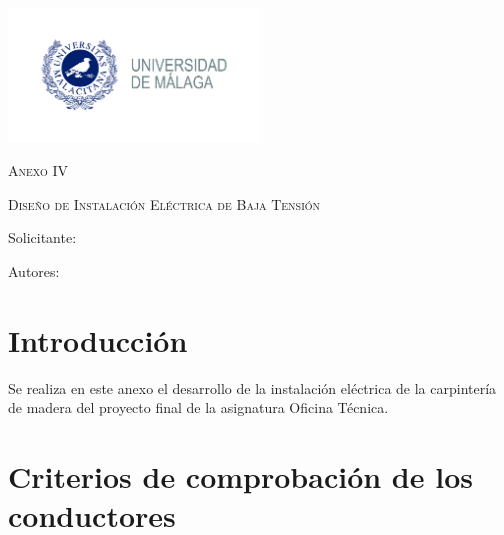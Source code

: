 \documentclass[../main.tex]{subfiles}
\begin{document}
\newpage
\thispagestyle{empty}
\begin{center}
    {\includegraphics[width=0.5\textwidth]{Imagenes/Logo UMA.jpg}\par}
    \vspace{1cm}
    {\bfseries\LARGE \Facultad \par}
    \vspace{0.5cm}
    {\scshape\Large \Grado \par}
    \vspace{1cm}
    {\scshape\Huge Anexo IV \par}
    \vspace{0.5cm}
    {\scshape\Huge Diseño de Instalación Eléctrica de Baja Tensión \par}
    \vspace{1.5cm}
    {\itshape\Large \TituloProyecto \par}
    \vfill
    {\Large Solicitante: \par}
    {\Large \Solicitante  \par}
    \vspace{1cm}
    {\Large Autores: \par}
    {\Large \Autora \par}
    {\Large \Autor \par}
    \vfill
    {\Large \Fecha \par}
\end{center}

\newpage

\section{Introducción}



Se realiza en este anexo el desarrollo de la instalación eléctrica de la carpintería de madera del proyecto final de la asignatura Oficina Técnica. 


\section{Criterios de comprobación de los conductores}
\end{document}
